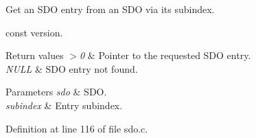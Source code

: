 Get an S\-D\-O entry from an S\-D\-O via its subindex. 

const version.


\begin{DoxyRetVals}{Return values}
{\em $>$0} & Pointer to the requested S\-D\-O entry. \\
\hline
{\em N\-U\-L\-L} & S\-D\-O entry not found. \\
\hline
\end{DoxyRetVals}

\begin{DoxyParams}{Parameters}
{\em sdo} & S\-D\-O. \\
\hline
{\em subindex} & Entry subindex. \\
\hline
\end{DoxyParams}


Definition at line 116 of file sdo.\-c.

